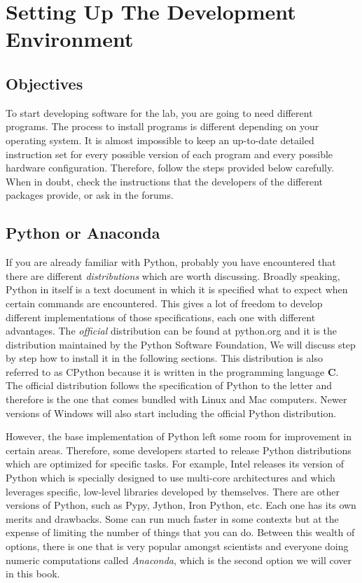 \chapter{Setting Up The Development Environment}\label{chapter:setting-up}
\section{Objectives}
To start developing software for the lab, you are going to need different programs. The process to install programs is different depending on your operating system. It is almost impossible to keep an up-to-date detailed instruction set for every possible version of each program and every possible hardware configuration. Therefore, follow the steps provided below carefully. When in doubt, check the instructions that the developers of the different packages provide, or ask in the forums. 

\section{Python or Anaconda}
If you are already familiar with Python, probably you have encountered that there are different \emph{distributions} which are worth discussing. Broadly speaking, Python in itself is a text document in which it is specified what to expect when certain commands are encountered. This gives a lot of freedom to develop different implementations of those specifications, each one with different advantages. The \emph{official} distribution can be found at python.org and it is the distribution maintained by the Python Software Foundation, We will discuss step by step how to install it in the following sections. This distribution is also referred to as CPython because it is written in the programming language \textbf{C}. The official distribution follows the specification of Python to the letter and therefore is the one that comes bundled with Linux and Mac computers. Newer versions of Windows will also start including the official Python distribution. 

However, the base implementation of Python left some room for improvement in certain areas. Therefore, some developers started to release Python distributions which are optimized for specific tasks. For example, Intel releases its version of Python which is specially designed to use multi-core architectures and which leverages specific, low-level libraries developed by themselves. There are other versions of Python, such as Pypy, Jython, Iron Python, etc. Each one has its own merits and drawbacks. Some can run much faster in some contexts but at the expense of limiting the number of things that you can do. Between this wealth of options, there is one that is very popular amongst scientists and everyone doing numeric computations called \emph{Anaconda}, which is the second option we will cover in this book. 

